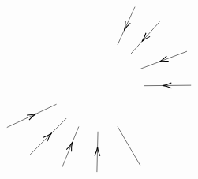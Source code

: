 \documentclass{article}
\begin{document}
\begin{example}
\[\begin{tikzpicture}[x=0.75pt,y=0.75pt,yscale=-1,xscale=1]
\draw    (216.33,5.33) -- (195.33,51.33) ;
\draw [shift={(203.34,33.79)}, rotate = 294.54] [color={rgb, 255:red, 0; green, 0; blue, 0 }  ][line width=0.75]    (10.93,-3.29) .. controls (6.95,-1.4) and (3.31,-0.3) .. (0,0) .. controls (3.31,0.3) and (6.95,1.4) .. (10.93,3.29)   ;
\draw    (246.33,23.33) -- (211.33,62.33) ;
\draw [shift={(224.83,47.3)}, rotate = 311.91] [color={rgb, 255:red, 0; green, 0; blue, 0 }  ][line width=0.75]    (10.93,-3.29) .. controls (6.95,-1.4) and (3.31,-0.3) .. (0,0) .. controls (3.31,0.3) and (6.95,1.4) .. (10.93,3.29)   ;
\draw    (279.33,59.33) -- (223.33,80.33) ;
\draw [shift={(245.72,71.94)}, rotate = 339.44] [color={rgb, 255:red, 0; green, 0; blue, 0 }  ][line width=0.75]    (10.93,-3.29) .. controls (6.95,-1.4) and (3.31,-0.3) .. (0,0) .. controls (3.31,0.3) and (6.95,1.4) .. (10.93,3.29)   ;
\draw    (284.33,100.33) -- (226.93,100.87) ;
\draw [shift={(249.63,100.66)}, rotate = 359.47] [color={rgb, 255:red, 0; green, 0; blue, 0 }  ][line width=0.75]    (10.93,-3.29) .. controls (6.95,-1.4) and (3.31,-0.3) .. (0,0) .. controls (3.31,0.3) and (6.95,1.4) .. (10.93,3.29)   ;
\draw    (61.33,151.33) -- (121.33,123.33) ;
\draw [shift={(96.77,134.8)}, rotate = 154.98] [color={rgb, 255:red, 0; green, 0; blue, 0 }  ][line width=0.75]    (10.93,-3.29) .. controls (6.95,-1.4) and (3.31,-0.3) .. (0,0) .. controls (3.31,0.3) and (6.95,1.4) .. (10.93,3.29)   ;
\draw    (89.33,184.33) -- (133.33,140.33) ;
\draw [shift={(115.58,158.09)}, rotate = 135] [color={rgb, 255:red, 0; green, 0; blue, 0 }  ][line width=0.75]    (10.93,-3.29) .. controls (6.95,-1.4) and (3.31,-0.3) .. (0,0) .. controls (3.31,0.3) and (6.95,1.4) .. (10.93,3.29)   ;
\draw    (128.33,199.33) -- (148.33,150.33) ;
\draw [shift={(140.6,169.28)}, rotate = 112.2] [color={rgb, 255:red, 0; green, 0; blue, 0 }  ][line width=0.75]    (10.93,-3.29) .. controls (6.95,-1.4) and (3.31,-0.3) .. (0,0) .. controls (3.31,0.3) and (6.95,1.4) .. (10.93,3.29)   ;
\draw    (170.33,205.33) -- (171.47,156.33) ;
\draw [shift={(171.04,174.83)}, rotate = 91.32] [color={rgb, 255:red, 0; green, 0; blue, 0 }  ][line width=0.75]    (10.93,-3.29) .. controls (6.95,-1.4) and (3.31,-0.3) .. (0,0) .. controls (3.31,0.3) and (6.95,1.4) .. (10.93,3.29)   ;
\draw    (223.33,198.33) -- (195.33,150.33) ;

\end{tikzpicture}\]
\end{example}
\end{document}
